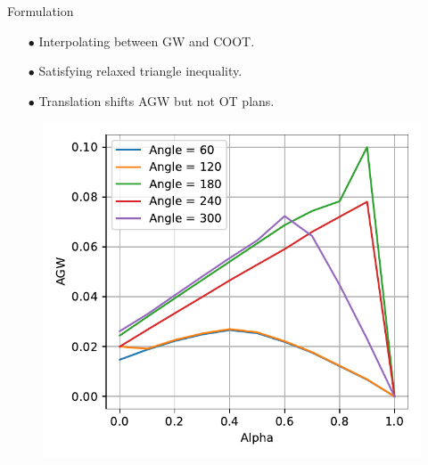 \documentclass{beamer}
\begin{document}
\begin{frame}{Formulation}
\begin{minipage}[t]{0.55\linewidth}
  \begin{itemize}
    \item[$\bullet$] Interpolating between GW and COOT.
    \item[$\bullet$] Satisfying relaxed triangle inequality.
    \item[$\bullet$] Translation shifts AGW but not OT plans.
  \end{itemize}
  \end{minipage}%
  \hfill%
  \hspace{-6cm}
  \begin{minipage}[t]{0.5\linewidth}
    \vspace{-0.5cm}
  \begin{figure}
    \centering
    \includegraphics[width=1.05\linewidth, keepaspectratio=true]{OT_new/agw_alpha.pdf}
  \end{figure}
  \end{minipage}

\end{frame}
\end{document}
